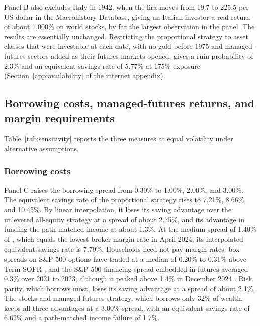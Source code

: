 \documentclass[12pt]{article}
\makeatletter
\newif\ifsubmission
\newcommand{\exhibitlist}{}
\newcommand{\exhibit}[1]{\ifsubmission\g@addto@macro\exhibitlist{}\else\fi}
\makeatother
\begin{document}
Panel B also excludes Italy in 1942, when the lira moves from 19.7 to 225.5 per US dollar in the
Macrohistory Database, giving an Italian investor a real return of about 1,000\% on world stocks, by far
the largest observation in the panel. The results are essentially unchanged. Restricting the proportional
strategy to asset classes that were investable at each date, with no gold before 1975 and
managed-futures sectors added as their futures markets opened, gives a ruin probability of 2.3\% and an
equivalent savings rate of 5.77\% at 175\% exposure (Section~\ref{app:availability} of the internet
appendix).

\subsection{Borrowing costs, managed-futures returns, and margin requirements}
\label{sec:robustness}\label{sec:costs}\label{sec:mf-proxy}

Table~\ref{tab:sensitivity} reports the three measures at equal volatility under alternative
assumptions.
\exhibit{figures/erc/sensitivity.tex}

\subsubsection{Borrowing costs}

Panel C raises the borrowing spread from 0.30\% to 1.00\%, 2.00\%, and 3.00\%. The equivalent savings
rate of the proportional strategy rises to 7.21\%, 8.66\%, and 10.45\%. By linear interpolation, it loses
its saving advantage over the unlevered all-equity strategy at a spread of about 2.75\%, and its advantage
in funding the path-matched income at about 1.3\%. At the medium spread of 1.40\% of
\citet{AnarkulovaCederburgODoherty2025}, which equals the lowest broker margin rate in April 2024, its
interpolated equivalent savings rate is 7.79\%. Households need not pay margin rates: box spreads on
S\&P 500 options have traded at a median of 0.20\% to 0.31\% above Term SOFR
\citep{CMEBoxFinancing2024}, and the S\&P 500 financing spread embedded in futures averaged 0.3\% over
2021 to 2023, although it peaked above 1.4\% in December 2024 \citep{DEShaw2025}. Risk parity, which borrows most, loses its saving advantage
at a spread of about 2.1\%. The stocks-and-managed-futures strategy, which borrows only 32\% of wealth,
keeps all three advantages at a 3.00\% spread, with an equivalent savings rate of 6.62\% and a
path-matched income failure of 1.7\%.
\end{document}
